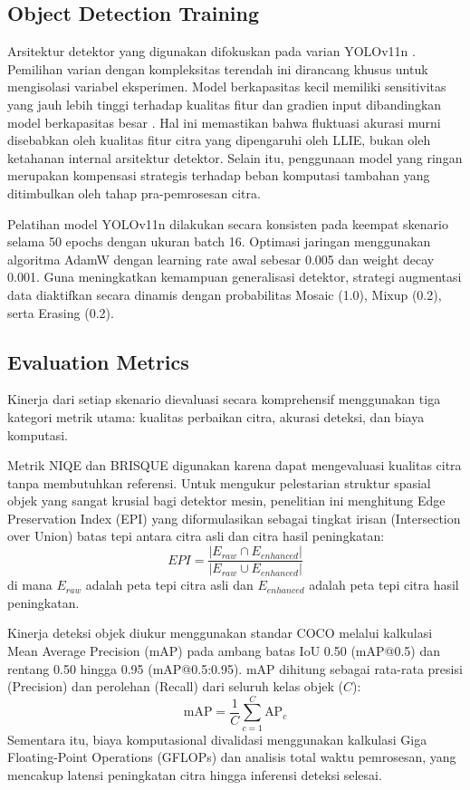 \documentclass[conference]{IEEEtran}
\begin{document}
\subsection{Object Detection Training}
Arsitektur detektor yang digunakan difokuskan pada varian YOLOv11n \cite{khanam2024yolov11}. Pemilihan varian dengan kompleksitas terendah ini dirancang khusus untuk mengisolasi variabel eksperimen. Model berkapasitas kecil memiliki sensitivitas yang jauh lebih tinggi terhadap kualitas fitur dan gradien input dibandingkan model berkapasitas besar \cite{dobrzycki2025freezing}. Hal ini memastikan bahwa fluktuasi akurasi murni disebabkan oleh kualitas fitur citra yang dipengaruhi oleh LLIE, bukan oleh ketahanan internal arsitektur detektor. Selain itu, penggunaan model yang ringan merupakan kompensasi strategis terhadap beban komputasi tambahan yang ditimbulkan oleh tahap pra-pemrosesan citra.

Pelatihan model YOLOv11n dilakukan secara konsisten pada keempat skenario selama 50 epochs dengan ukuran batch 16. Optimasi jaringan menggunakan algoritma AdamW dengan learning rate awal sebesar 0.005 dan weight decay 0.001. Guna meningkatkan kemampuan generalisasi detektor, strategi augmentasi data diaktifkan secara dinamis dengan probabilitas Mosaic (1.0), Mixup (0.2), serta Erasing (0.2).

\subsection{Evaluation Metrics}
Kinerja dari setiap skenario dievaluasi secara komprehensif menggunakan tiga kategori metrik utama: kualitas perbaikan citra, akurasi deteksi, dan biaya komputasi. 

Metrik NIQE \cite{mittal2013niqe} dan BRISQUE \cite{mittal2012brisque} digunakan karena dapat mengevaluasi kualitas citra tanpa membutuhkan referensi. Untuk mengukur pelestarian struktur spasial objek yang sangat krusial bagi detektor mesin, penelitian ini menghitung Edge Preservation Index (EPI) yang diformulasikan sebagai tingkat irisan (Intersection over Union) batas tepi antara citra asli dan citra hasil peningkatan:
\begin{equation}
EPI = \frac{|E_{raw} \cap E_{enhanced}|}{|E_{raw} \cup E_{enhanced}|}
\end{equation}
di mana $E_{raw}$ adalah peta tepi citra asli dan $E_{enhanced}$ adalah peta tepi citra hasil peningkatan.

Kinerja deteksi objek diukur menggunakan standar COCO \cite{padilla2021metrics} melalui kalkulasi Mean Average Precision (mAP) pada ambang batas IoU 0.50 (mAP@0.5) dan rentang 0.50 hingga 0.95 (mAP@0.5:0.95). mAP dihitung sebagai rata-rata presisi (Precision) dan perolehan (Recall) dari seluruh kelas objek ($C$):
\begin{equation}
\text{mAP} = \frac{1}{C} \sum_{c=1}^{C} \text{AP}_c
\end{equation}
Sementara itu, biaya komputasional divalidasi menggunakan kalkulasi Giga Floating-Point Operations (GFLOPs) \cite{akavaram2025flops} dan analisis total waktu pemrosesan, yang mencakup latensi peningkatan citra hingga inferensi deteksi selesai.
\end{document}

